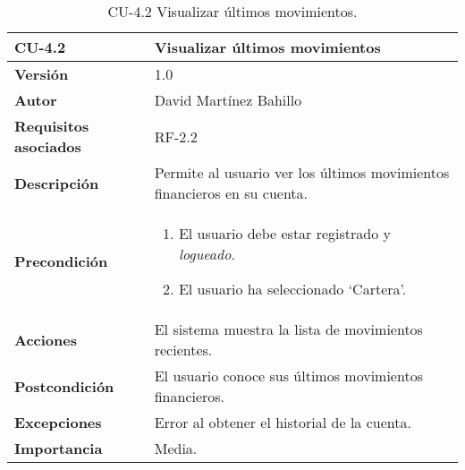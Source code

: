 \begin{table}[p]
	\centering
	\begin{tabularx}{\linewidth}{ p{} p{} }
		\toprule
		\textbf{CU-4.2}  & \textbf{Visualizar últimos movimientos}\\
		\midrule
		\textbf{Versión}              & 1.0    \\
		\textbf{Autor}                & David Martínez Bahillo \\
		\textbf{Requisitos asociados} & RF-2.2 \\
		\textbf{Descripción}          & Permite al usuario ver los últimos movimientos financieros en su cuenta. \\
		\textbf{Precondición}         &  
		\begin{enumerate}
			\def\labelenumi{\arabic{enumi}.}
			\tightlist
			\item El usuario debe estar registrado y \textit{logueado}.
			\item El usuario ha seleccionado `Cartera'.
		\end{enumerate}\\
		\textbf{Acciones}             & El sistema muestra la lista de movimientos recientes. \\
		\textbf{Postcondición}        & El usuario conoce sus últimos movimientos financieros. \\
		\textbf{Excepciones}          & Error al obtener el historial de la cuenta. \\
		\textbf{Importancia}          & Media.  \\
		\bottomrule
	\end{tabularx}
	\caption{CU-4.2 Visualizar últimos movimientos.}
\end{table}



